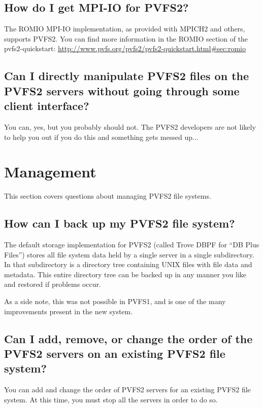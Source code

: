\documentclass[11pt,letterpaper]{article}
\begin{document}
\subsection{How do I get MPI-IO for PVFS2?}

The ROMIO MPI-IO implementation, as provided with MPICH2 and others, supports
PVFS2.  You can find more information in the ROMIO section of the
pvfs2-quickstart: \url{http://www.pvfs.org/pvfs2/pvfs2-quickstart.html\#sec:romio}

\subsection{Can I directly manipulate PVFS2 files on the PVFS2 servers
            without going through some client interface?}

You can, yes, but you probably should not.  The PVFS2 developers are not
likely to help you out if you do this and something gets messed up...

%
%
\section{Management}

This section covers questions about managing PVFS2 file systems.

\subsection{How can I back up my PVFS2 file system?}

The default storage implementation for PVFS2 (called Trove DBPF for ``DB Plus
Files'') stores all file system data held by a single server in a single
subdirectory.  In that subdirectory is a directory tree containing UNIX files
with file data and metadata.
%
This entire directory tree can be backed up in any manner you like and
restored if problems occur.

As a side note, this was not possible in PVFS1, and is one of the many
improvements present in the new system.

\subsection{Can I add, remove, or change the order of the PVFS2 servers
            on an existing PVFS2 file system?}

You can add and change the order of PVFS2 servers for an existing PVFS2 file
system.  At this time, you must stop all the servers in order to do so.
\end{document}
